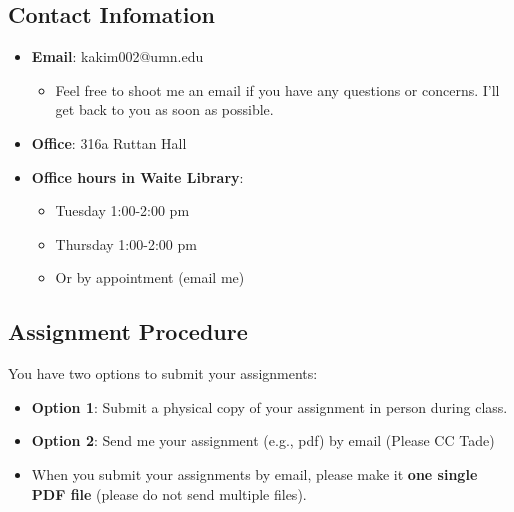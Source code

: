 \documentclass[
  letterpaper,
  DIV=11,
  numbers=noendperiod]{scrartcl}
\providecommand{\tightlist}{%
  \setlength{\itemsep}{0pt}\setlength{\parskip}{0pt}}\usepackage{longtable,booktabs,array}
\begin{document}
\subsection{Contact Infomation}\label{contact-infomation}

\begin{itemize}
\tightlist
\item
   \textbf{Email}: kakim002@umn.edu

  \begin{itemize}
  \tightlist
  \item
    Feel free to shoot me an email if you have any questions or
    concerns. I'll get back to you as soon as possible.
  \end{itemize}
\item
   \textbf{Office}: 316a Ruttan Hall
\end{itemize}

\begin{itemize}
\tightlist
\item
  \textbf{Office hours in Waite Library}:

  \begin{itemize}
  \tightlist
  \item
    Tuesday 1:00-2:00 pm
  \item
    Thursday 1:00-2:00 pm
  \item
    Or by appointment (email me)
  \end{itemize}
\end{itemize}

\subsection{Assignment Procedure}\label{assignment-procedure}

You have two options to submit your assignments:

\begin{itemize}
\tightlist
\item
  \textbf{Option 1}: Submit a physical copy of your assignment in person
  during class.
\item
  \textbf{Option 2}: Send me your assignment (e.g., pdf) by email
  (Please CC Tade)
\end{itemize}

\begin{tcolorbox}[enhanced jigsaw, left=2mm, bottomrule=.15mm, rightrule=.15mm, colback=white, title=\textcolor{quarto-callout-caution-color}{\faFire}\hspace{0.5em}{Please make sure to:}, colbacktitle=quarto-callout-caution-color!10!white, toprule=.15mm, colframe=quarto-callout-caution-color-frame, titlerule=0mm, bottomtitle=1mm, toptitle=1mm, arc=.35mm, breakable, opacityback=0, leftrule=.75mm, opacitybacktitle=0.6, coltitle=black]

\begin{itemize}
\tightlist
\item
  When you submit your assignments by email, please make it {\textbf{one
  single PDF file}} (please do not send multiple files).
\end{itemize}

\end{tcolorbox}
\end{document}
